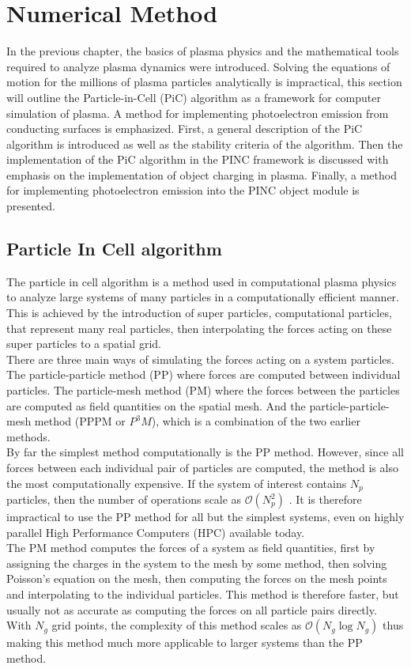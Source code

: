 \chapter{Numerical Method}
\label{sec:methods}
In the previous chapter, the basics of plasma physics and the mathematical tools required to analyze plasma dynamics were introduced. Solving the equations of motion for the millions of plasma particles analytically is impractical, this section will outline the Particle-in-Cell (PiC) algorithm as a framework for computer simulation of plasma. A method for implementing photoelectron emission from conducting surfaces is emphasized. First, a general description of the PiC algorithm is introduced as well as the stability criteria of the algorithm. Then the implementation of the PiC algorithm in the PINC framework is discussed with emphasis on the implementation of object charging in plasma. Finally, a method for implementing photoelectron emission into the PINC object module is presented.

\section{Particle In Cell algorithm}
The particle in cell algorithm is a method used in computational plasma physics to analyze large systems of many particles in a computationally efficient manner. This is achieved by the introduction of super particles, computational particles, that represent many real particles, then interpolating the forces acting on these super particles to a spatial grid.\\
There are three main ways of simulating the forces acting on a system particles. The particle-particle method (PP) where forces are computed between individual particles. The particle-mesh method (PM) where the forces between the particles are computed as field quantities on the spatial mesh. And the particle-particle-mesh method (PPPM or $P^3M$), which is a combination of the two earlier methods.\\
By far the simplest method computationally is the PP method. However, since all forces between each individual pair of particles are computed, the method is also the most computationally expensive. If the system of interest contains $N_p$ particles, then the number of operations scale as $\mathcal{O}(N^2_p)$ . It is therefore impractical to use the PP method for all but the simplest systems, even on highly parallel High Performance Computers (HPC) available today.\\
The PM method computes the forces of a system as field quantities, first by assigning the charges in the system to the mesh by some method, then solving Poisson's equation on the mesh, then computing the forces on the mesh points and interpolating to the individual particles. This method is therefore faster, but usually not as accurate as computing the forces on all particle pairs directly. With $N_g$ grid points, the complexity of this method scales as $\mathcal{O}(N_g \log{N_g})$ thus making this method much more applicable to larger systems than the PP method.

